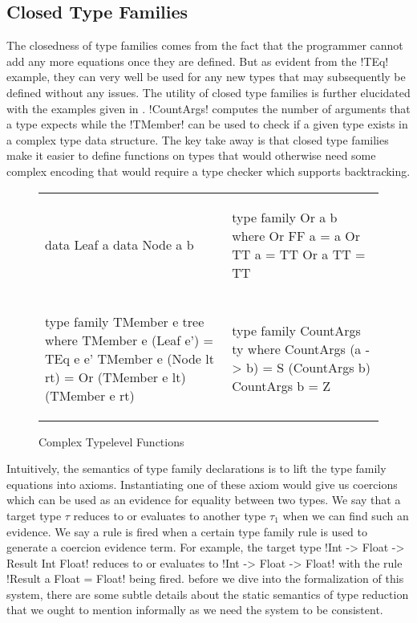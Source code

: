 \documentclass[format=sigplan,manuscript,review,screen,nonacm,margin=1in]{acmart}
\begin{document}
\subsection{Closed Type Families}\label{subsec:tf-closed}
The closedness of type families comes from the fact that the programmer cannot add any more equations once they
are defined. But as evident from the !TEq! example, they can very well be used for any new types
that may subsequently be defined without any issues. 
The utility of closed type families is further elucidated with the examples
given in . !CountArgs! computes the number of arguments that a type expects while the
!TMember! can be used to check if a given type exists in a complex type data structure.
The key take away is that closed type families make it easier to define functions on types
that would otherwise need some complex encoding that would require a type checker
which supports backtracking.
\begin{figure}[ht]
  \begin{tabular}{l l}
\begin{code}
data Leaf a
data Node a b
\end{code}&%
\begin{code}
type family Or a b where
  Or FF a = a
  Or TT a = TT
  Or a TT = TT
\end{code}\\
\begin{code}
type family TMember e tree where
  TMember e (Leaf e') = TEq e e'
  TMember e (Node lt rt) = Or (TMember e lt) (TMember e rt)
\end{code}&%
\begin{code}
type family CountArgs ty where
  CountArgs (a -> b) = S (CountArgs b)
  CountArgs b        = Z
\end{code}
  \end{tabular}
  \caption{Complex Typelevel Functions}
  \label{fig:tf-closed-examples}
\end{figure}

Intuitively, the semantics of type family declarations is to lift the type family equations into axioms.
Instantiating one of these axiom would give us coercions which can be
used as an evidence for equality between two types. We say that a target type $\tau$
reduces to or evaluates to another type $\tau_1$ when we can
find such an evidence. We say a rule is fired when a certain type family rule is used
to generate a coercion evidence term. For example, the target type !Int -> Float -> Result Int Float!
reduces to or evaluates to !Int -> Float -> Float! with the rule !Result a Float = Float! being fired.
before we dive into the formalization of this system, there are some subtle details about
the static semantics of type reduction that we ought to mention informally as we need the system to be consistent.
\end{document}
